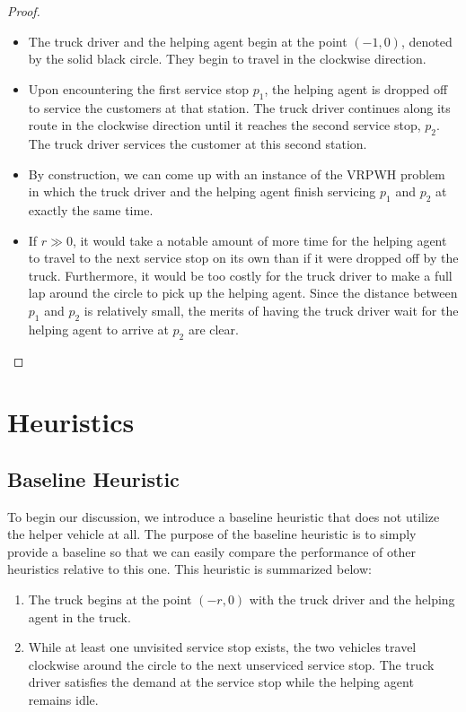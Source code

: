 \documentclass[12pt]{scrartcl}
\begin{document}
\begin{proof}
\begin{itemize}
    \item The truck driver and the helping agent begin at the point $(-1, 0)$, denoted by the solid black circle. They begin to travel in the clockwise direction. 
    \item Upon encountering the first service stop $p_1$, the helping agent is dropped off to service the customers at that station. The truck driver continues along its route in the clockwise direction until it reaches the second service stop, $p_2$. The truck driver services the customer at this second station. 
    \item By construction, we can come up with an instance of the VRPWH problem in which the truck driver and the helping agent finish servicing $p_1$ and $p_2$ at exactly the same time.  
    \item If $r \gg 0$, it would take a notable amount of more time for the helping agent to travel to the next service stop on its own than if it were dropped off by the truck. Furthermore, it would be too costly for the truck driver to make a full lap around the circle to pick up the helping agent. Since the distance between $p_1$ and $p_2$ is relatively small, the merits of having the truck driver wait for the helping agent to arrive at $p_2$ are clear. 
\end{itemize}
\end{proof}



\section{Heuristics}
\subsection{Baseline Heuristic}
To begin our discussion, we introduce a baseline heuristic that does not utilize the helper vehicle at all. The purpose of the baseline heuristic is to simply provide a baseline so that we can easily compare the performance of other heuristics relative to this one. This heuristic is summarized below:

\begin{enumerate}
    \item The truck begins at the point $(-r, 0)$ with the truck driver and the helping agent in the truck. 
    \item While at least one unvisited service stop exists, the two vehicles travel clockwise around the circle to the next unserviced service stop. The truck driver satisfies the demand at the service stop while the helping agent remains idle. 
\end{enumerate}
\end{document}
